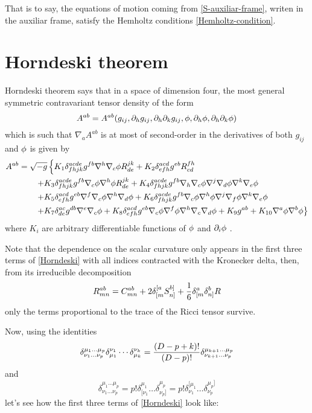 That is to say, the equations of motion coming from \eqref{S-auxiliar-frame}, writen in the auxiliar frame, satisfy the Hemholtz conditions \eqref{Hemholtz-condition}.


\section{Horndeski theorem}
Horndeski theorem says that in a space of dimension four, the most general symmetric contravariant tensor density of the form
\begin{equation}
  A^{ab}=A^{ab}(g_{ij},\partial_hg_{ij},\partial_{h}\partial_k g_{ij},\phi,\partial_h\phi,\partial_h\partial_k\phi )
\end{equation}
which is such that $\nabla_aA^{ab }$ is at most of second-order in the derivatives of both $g_{ij}$ and $\phi$ is given by
\begin{equation}\label{Horndeski}
\begin{split}
  A^{ab}&=\sqrt{-g}\left\{K_1\delta^{acde}_{fhjk}g^{fb}\nabla^h\nabla_c\phi R^{jk}_{de}+K_2\delta^{acd}_{efh}g^{eb}R^{fh}_{cd}\right.\\
  &\left.\qquad +K_3\delta^{acde}_{fhjk}g^{fb}\nabla_c\phi\nabla^h\phi R^{jk}_{de}+K_4\delta^{acde}_{fhjk}g^{fb}\nabla_h\nabla_c\phi \nabla^j\nabla_d\phi \nabla^k\nabla_e\phi \right.\\
  &\left.\qquad +K_5\delta^{acd}_{efh}g^{eb}\nabla^f\nabla_c\phi \nabla^h\nabla_d\phi +K_6\delta^{acde}_{fhjk}g^{fb}\nabla_c\phi \nabla^h\phi \nabla^j\nabla_f\phi \nabla^k\nabla_e\phi \right.\\
  &\left.\qquad +K_7\delta^{ac}_{de}g^{db}\nabla^{e}\nabla_c\phi+K_8\delta^{acd}_{efh}g^{eb}\nabla_c\phi \nabla^f\phi \nabla^h\nabla_c\nabla_d\phi +K_9g^{ab}+K_{10}\nabla^{a}\phi\nabla^b\phi  \right\}
\end{split}
\end{equation}
where $K_i $ are arbitrary differentiable functions of $\phi$ and $\partial_i\phi$ \cite{Horndeski:1974wa}.

Note that the dependence on the scalar curvature only appears in the first three terms of \eqref{Horndeski} with all indices contracted with the Kronecker delta, then, from its irreducible decomposition
\begin{equation}\label{R-CSR}
  R^{ab}_{mn}=C^{ab}_{mn}+2\delta^{[a}_{[m}S^{b]}_{n]}+\frac{1}{6}\delta^{a}_{[m}\delta^b_{n]}R
\end{equation}
 only the terms proportional to the trace of the Ricci tensor survive.
 
 Now, using the identities
 \begin{equation}
  \delta^{\mu_1...\mu_p}_{\nu_1...\nu_p}\delta^{\nu_1}_{\mu_1}\cdots \delta^{\nu_k}_{\mu_k}=\frac{(D-p+k)!}{(D-p)!}\delta^{\mu_{k+1}...\mu_p}_{\nu_{k+1}...\nu_p}
\end{equation}
and
\begin{equation}
  {\displaystyle \delta _{\nu _{1}\dots \nu _{p}}^{\mu _{1}\dots \mu _{p}}=p!\delta _{[\nu _{1}}^{\mu _{1}}\dots \delta _{\nu _{p}]}^{\mu _{p}}=p!\delta _{\nu _{1}}^{[\mu _{1}}\dots \delta _{\nu _{p}}^{\mu _{p}]}}
\end{equation}
 let's see how the first three terms of \eqref{Horndeski} look like:
 

